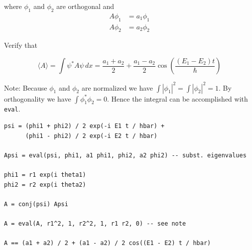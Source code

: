 \documentclass[12pt]{article}
\begin{document}
\begin{enumerate}
where $\phi_1$ and $\phi_2$ are orthogonal and
\begin{align*}
A\phi_1&=a_1\phi_1
\\
A\phi_2&=a_2\phi_2
\end{align*}

Verify that

\begin{equation*}
\langle A\rangle
=\int\psi^*A\psi\,dx
=\frac{a_1+a_2}{2}+\frac{a_1-a_2}{2}\cos\left(\frac{(E_1-E_2)t}{\hbar}\right)
\end{equation*}

Note: Because $\phi_1$ and $\phi_2$ are normalized we have $\int|\phi_1|^2=\int|\phi_2|^2=1$.
By orthogonality we have $\int\phi_1^*\phi_2=0$.
Hence the integral can be accomplished with \verb$eval$.

\begin{verbatim}
psi = (phi1 + phi2) / 2 exp(-i E1 t / hbar) +
      (phi1 - phi2) / 2 exp(-i E2 t / hbar)

Apsi = eval(psi, phi1, a1 phi1, phi2, a2 phi2) -- subst. eigenvalues

phi1 = r1 exp(i theta1)
phi2 = r2 exp(i theta2)

A = conj(psi) Apsi

A = eval(A, r1^2, 1, r2^2, 1, r1 r2, 0) -- see note

A == (a1 + a2) / 2 + (a1 - a2) / 2 cos((E1 - E2) t / hbar)
\end{verbatim}

\end{enumerate}
\end{document}
